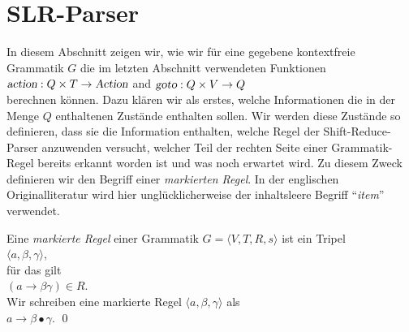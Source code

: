 \section{SLR-Parser}
In diesem Abschnitt zeigen wir, wie wir f\"ur eine gegebene kontextfreie Grammatik $G$ 
die im letzten Abschnitt verwendeten Funktionen 
\\[0.2cm]
\hspace*{1.3cm}
$\textsl{action}: Q \times T \rightarrow \textsl{Action}$ \quad and \quad $\textsl{goto}: Q \times V \rightarrow Q$
\\[0.2cm]
berechnen k\"onnen.  Dazu kl\"aren wir als erstes, welche Informationen die in der Menge $Q$ enthaltenen Zust\"ande 
enthalten sollen.  Wir werden diese Zust\"ande so definieren, dass sie die Information enthalten,
welche Regel der Shift-Reduce-Parser anzuwenden versucht, welcher Teil der rechten Seite einer Grammatik-Regel 
bereits erkannt worden ist und was noch erwartet wird.  Zu diesem Zweck definieren wir den Begriff
einer \emph{markierten Regel}.   In der englischen Originalliteratur \cite{knuth:65} wird hier
ungl\"ucklicherweise der inhaltsleere Begriff ``\emph{item}'' verwendet.

\begin{Definition}
  Eine \emph{markierte Regel} einer Grammatik $G = \langle V, T, R, s \rangle$ ist ein Tripel
  \\[0.2cm]
  \hspace*{1.3cm}
  $\langle a, \beta, \gamma \rangle$,
  \\[0.2cm]
  f\"ur das gilt
  \\[0.2cm]
  \hspace*{1.3cm}
  $(a \rightarrow \beta \gamma) \in R$.
  \\[0.2cm]
  Wir schreiben eine markierte Regel $\langle a, \beta, \gamma \rangle$ als
  \\[0.2cm]
  \hspace*{1.3cm}
  $a \rightarrow \beta \bullet \gamma$. \qed 
\end{Definition}

